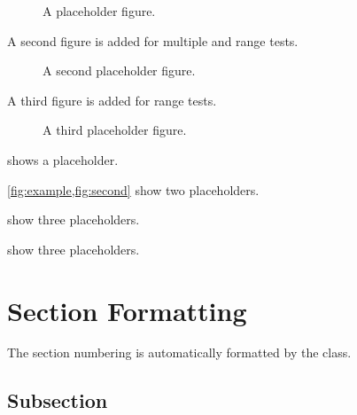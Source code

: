 \documentclass[11pt]{../class/journalpaper}
\begin{document}
\begin{figure}[htbp]
    \centering

    \fbox{%
        \rule{0pt}{45mm}%
        \rule{0.8\linewidth}{0pt}%
    }

    \caption{A placeholder figure.}
    \label{fig:example}
\end{figure}

A second figure is added for multiple and range tests.

\begin{figure}[htbp]
    \centering

    \fbox{%
        \rule{0pt}{45mm}%
        \rule{0.6\linewidth}{0pt}%
    }

    \caption{A second placeholder figure.}
    \label{fig:second}
\end{figure}

A third figure is added for range tests.

\begin{figure}[htbp]
    \centering

    \fbox{%
        \rule{0pt}{45mm}%
        \rule{0.4\linewidth}{0pt}%
    }

    \caption{A third placeholder figure.}
    \label{fig:third}
\end{figure}

 shows a placeholder.

\cref{fig:example,fig:second} show two placeholders.

 show three placeholders.

 show three placeholders.



\section{Section Formatting}

The section numbering is automatically formatted by the class.

\subsection{Subsection}
\end{document}
